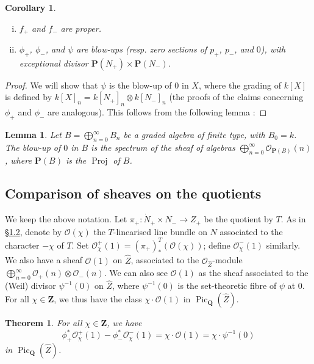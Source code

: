 \documentclass{article}
\theoremstyle{plain}
\newtheorem*{theorem}{Theorem}
\newtheorem*{lemma}{Lemma}
\newtheorem*{corollary}{Corollary}
\theoremstyle{definition}
\newcommand{\scr}[1]{{\mathscr{#1}}}
\newcommand{\PP}{\mathbf{P}}
\newcommand{\QQ}{\mathbf{Q}}
\newcommand{\ZZ}{\mathbf{Z}}
\DeclareMathOperator{\Pic}{Pic}
\DeclareMathOperator{\Proj}{Proj}
\newcommand{\oldpage}[1]{\marginpar{\footnotesize$\Big\vert$ \textit{p.~#1}}}
\begin{document}
\begin{corollary}
  \begin{enumerate}[(i)]
    \item $f_+$ and $f_-$ are proper.
    \item $\phi_+$, $\phi_-$, and $\psi$ are blow-ups (resp. zero sections of $p_+$, $p_-$, and $0$), with exceptional divisor $\PP(N_+)\times\PP(N_-)$.
  \end{enumerate}
\end{corollary}

\begin{proof}
  We will show that $\psi$ is the blow-up of $0$ in $X$, where the grading of $k[X]$ is defined by $k[X]_n=k[N_+]_n\otimes k[N_-]_n$ (the proofs of the claims concerning $\phi_+$ and $\phi_-$ are analogous).
  This follows from the following lemma \cite[2.5]{Fle}:
\end{proof}

\begin{lemma}
  Let $B=\bigoplus_{n=0}^\infty B_n$ be a graded algebra of finite type, with $B_0=k$.
  The blow-up of $0$ in $B$ is the spectrum of the sheaf of algebras $\bigoplus_{n=0}^\infty\scr{O}_{\PP(B)}(n)$, where $\PP(B)$ is the $\Proj$ of $B$.
\end{lemma}


\oldpage{520}
\subsection{Comparison of sheaves on the quotients}
\label{2.2}

We keep the above notation.
Let $\pi_+\colon\dot{N}_+\times N_-\to Z_+$ be the quotient by $T$.
As in \hyperref[1.2]{\S1.2}, denote by $\scr{O}(\chi)$ the $T$-linearised line bundle on $N$ associated to the character $-\chi$ of $T$.
Set $\scr{O}_\chi^+(1)=(\pi_+)_*^T(\scr{O}(\chi))$;
define $\scr{O}_\chi^-(1)$ similarly.
We also have a sheaf $\scr{O}(1)$ on $\hat{Z}$, associated to the $\scr{O}_{\hat{Z}}$-module $\bigoplus_{n=0}^\infty\scr{O}_+(n)\otimes\scr{O}_-(n)$.
We can also see $\scr{O}(1)$ as the sheaf associated to the (Weil) divisor $\psi^{-1}(0)$ on $\hat{Z}$, where $\psi^{-1}(0)$ is the set-theoretic fibre of $\psi$ at $0$.
For all $\chi\in\ZZ$, we thus have the class $\chi\cdot\scr{O}(1)$ in $\Pic_\QQ(\hat{Z})$.

\begin{theorem}
  For all $\chi\in\ZZ$, we have
  \[
    \phi_+^*\scr{O}_\chi^+(1) - \phi_-^*\scr{O}_\chi^-(1)
    = \chi\cdot\scr{O}(1)
    = \chi\cdot\psi^{-1}(0)
  \]
  in $\Pic_\QQ(\hat{Z})$.
\end{theorem}
\end{document}
